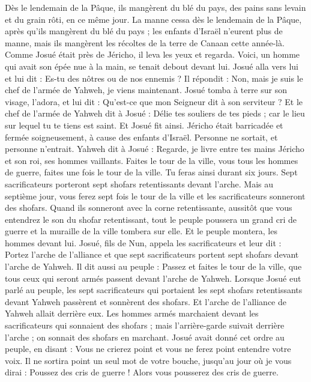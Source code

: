 \begin{multicols}{2}
Dès le lendemain de la Pâque, ils mangèrent du blé du pays, des pains sans levain et du grain rôti, en ce même jour.
La manne cessa dès le lendemain de la Pâque, après qu’ils mangèrent du blé du pays ; les enfants d’Israël n’eurent plus de manne, mais ils mangèrent les récoltes de la terre de Canaan cette année-là.
Comme Josué était près de Jéricho, il leva les yeux et regarda. Voici, un homme qui avait son épée nue à la main, se tenait debout devant lui. Josué alla vers lui et lui dit : Es-tu des nôtres ou de nos ennemis ?
Il répondit : Non, mais je suis le chef de l’armée de Yahweh, je viens maintenant. Josué tomba à terre sur son visage, l’adora, et lui dit : Qu’est-ce que mon Seigneur dit à son serviteur ?
Et le chef de l’armée de Yahweh dit à Josué : Délie tes souliers de tes pieds ; car le lieu sur lequel tu te tiens est saint. Et Josué fit ainsi.
\VerseOne{}Jéricho était barricadée et fermée soigneusement, à cause des enfants d’Israël. Personne ne sortait, et personne n’entrait.
Yahweh dit à Josué : Regarde, je livre entre tes mains Jéricho et son roi, ses hommes vaillants.
Faites le tour de la ville, vous tous les hommes de guerre, faites une fois le tour de la ville. Tu feras ainsi durant six jours.
Sept sacrificateurs porteront sept shofars retentissants devant l’arche. Mais au septième jour, vous ferez sept fois le tour de la ville et les sacrificateurs sonneront des shofars.
Quand ils sonneront avec la corne retentissante, aussitôt que vous entendrez le son du shofar retentissant, tout le peuple poussera un grand cri de guerre et la muraille de la ville tombera sur elle. Et le peuple montera, les hommes devant lui.
Josué, fils de Nun, appela les sacrificateurs et leur dit : Portez l’arche de l’alliance et que sept sacrificateurs portent sept shofars devant l’arche de Yahweh.
Il dit aussi au peuple : Passez et faites le tour de la ville, que tous ceux qui seront armés passent devant l’arche de Yahweh.
Lorsque Josué eut parlé au peuple, les sept sacrificateurs qui portaient les sept shofars retentissants devant Yahweh passèrent et sonnèrent des shofars. Et l’arche de l’alliance de Yahweh allait derrière eux.
Les hommes armés marchaient devant les sacrificateurs qui sonnaient des shofars ; mais l’arrière-garde suivait derrière l’arche ; on sonnait des shofars en marchant.
Josué avait donné cet ordre au peuple, en disant : Vous ne crierez point et vous ne ferez point entendre votre voix. Il ne sortira point un seul mot de votre bouche, jusqu’au jour où je vous dirai : Poussez des cris de guerre ! Alors vous pousserez des cris de guerre.

\end{multicols}
